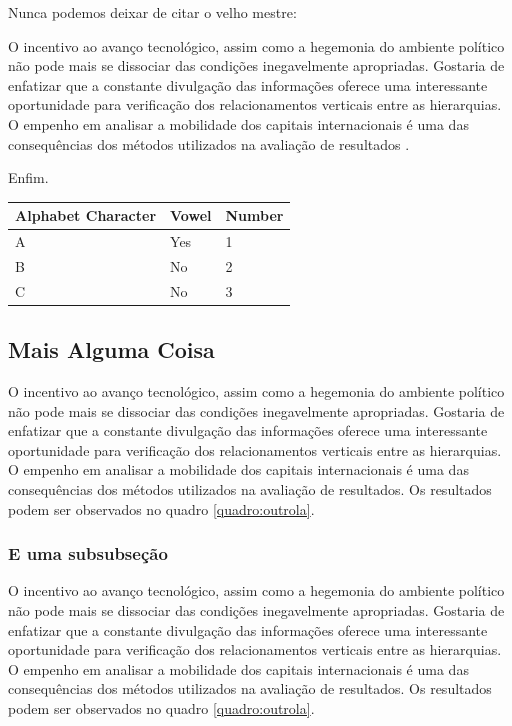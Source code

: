 \documentclass[chapter=TITLE,section=Title,espaco=duplo,tocpage=plain,appendix=Name,floatnumber=continuous]{abnt}
\begin{document}
Nunca podemos deixar de citar o velho mestre:

\begin{citacao}
O incentivo ao avanço tecnológico, assim como a hegemonia do ambiente
político não pode mais se dissociar das condições inegavelmente
apropriadas. Gostaria de enfatizar que a constante divulgação das
informações oferece uma interessante oportunidade para verificação dos
relacionamentos verticais entre as hierarquias. O empenho em analisar a
mobilidade dos capitais internacionais é uma das consequências dos métodos
utilizados na avaliação de resultados \cite{semolini2002support}.
\end{citacao}

Enfim.

\begin{table}
\centering
\begin{tabular}{lll}
\hline
Alphabet Character & Vowel & Number \\
\hline
A & Yes & 1 \\
B & No & 2 \\
C & No & 3 \\
\hline
\end{tabular}
\end{table}

\subsection{Mais Alguma Coisa}

O incentivo ao avanço tecnológico, assim como a hegemonia do ambiente político
não pode mais se dissociar das condições inegavelmente apropriadas. Gostaria de
enfatizar que a constante divulgação das informações oferece uma interessante
oportunidade para verificação dos relacionamentos verticais entre as
hierarquias. O empenho em analisar a mobilidade dos capitais internacionais é
uma das consequências dos métodos utilizados na avaliação de resultados. Os
resultados podem ser observados no quadro \ref{quadro:outrola}.

\subsubsection{E uma subsubseção}

O incentivo ao avanço tecnológico, assim como a hegemonia do ambiente político
não pode mais se dissociar das condições inegavelmente apropriadas. Gostaria de
enfatizar que a constante divulgação das informações oferece uma interessante
oportunidade para verificação dos relacionamentos verticais entre as
hierarquias. O empenho em analisar a mobilidade dos capitais internacionais é
uma das consequências dos métodos utilizados na avaliação de resultados. Os
resultados podem ser observados no quadro \ref{quadro:outrola}.
\end{document}
